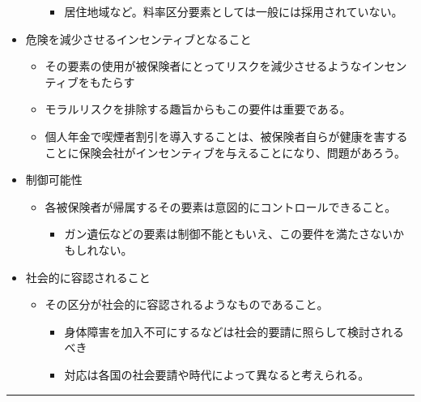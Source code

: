 \documentclass[
]{article}
\providecommand{\tightlist}{%
  \setlength{\itemsep}{0pt}\setlength{\parskip}{0pt}}
\begin{document}
\begin{itemize}
\begin{itemize}
    \begin{itemize}
    \tightlist
    \item
      居住地域など。料率区分要素としては一般には採用されていない。
    \end{itemize}
  \end{itemize}
\item
  危険を減少させるインセンティブとなること

  \begin{itemize}
  \tightlist
  \item
    その要素の使用が被保険者にとってリスクを減少させるようなインセンティブをもたらす
  \item
    モラルリスクを排除する趣旨からもこの要件は重要である。
  \item
    個人年金で喫煙者割引を導入することは、被保険者自らが健康を害することに保険会社がインセンティブを与えることになり、問題があろう。
  \end{itemize}
\item
  制御可能性

  \begin{itemize}
  \tightlist
  \item
    各被保険者が帰属するその要素は意図的にコントロールできること。

    \begin{itemize}
    \tightlist
    \item
      ガン遺伝などの要素は制御不能ともいえ、この要件を満たさないかもしれない。
    \end{itemize}
  \end{itemize}
\item
  社会的に容認されること

  \begin{itemize}
  \tightlist
  \item
    その区分が社会的に容認されるようなものであること。

    \begin{itemize}
    \tightlist
    \item
      身体障害を加入不可にするなどは社会的要請に照らして検討されるべき
    \item
      対応は各国の社会要請や時代によって異なると考えられる。
    \end{itemize}
  \end{itemize}
\end{itemize}

\begin{center}\rule{0.5\linewidth}{0.5pt}\end{center}
\end{document}
